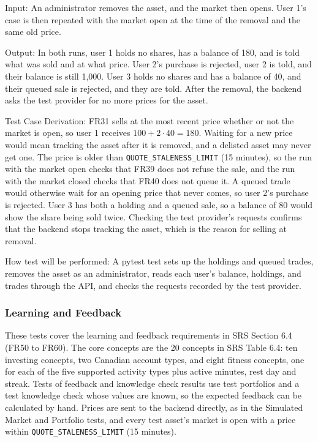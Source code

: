 \documentclass[12pt, titlepage]{article}
\begin{document}
\begin{enumerate}
Input: An administrator removes the asset, and the market then opens. User 1's
case is then repeated with the market open at the time of the removal and the
same old price.

Output: In both runs, user 1 holds no shares, has a balance of 180, and is told
what was sold and at what price. User 2's purchase is rejected, user 2 is told,
and their balance is still 1,000. User 3 holds no shares and has a balance of
40, and their queued sale is rejected, and they are told. After the removal,
the backend asks the test provider for no more prices for the asset.

Test Case Derivation: FR31 sells at the most recent price whether or not the
market is open, so user 1 receives $100 + 2 \cdot 40 = 180$. Waiting for a new
price would mean tracking the asset after it is removed, and a delisted asset
may never get one. The price is older than \texttt{QUOTE\_STALENESS\_LIMIT} (15
minutes), so the run with the market open checks that FR39 does not refuse the
sale, and the run with the market closed checks that FR40 does not queue it. A
queued trade would otherwise wait for an opening price that never comes, so
user 2's purchase is rejected. User 3 has both a holding and a queued sale, so
a balance of 80 would show the share being sold twice. Checking the test
provider's requests confirms that the backend stops tracking the asset, which
is the reason for selling at removal.

How test will be performed: A pytest test sets up the holdings and queued
trades, removes the asset as an administrator, reads each user's balance,
holdings, and trades through the API, and checks the requests recorded by the
test provider.

\end{enumerate}

\subsubsection{Learning and Feedback}

These tests cover the learning and feedback requirements in SRS Section 6.4
(FR50 to FR60). The core concepts are the 20 concepts in SRS Table 6.4: ten
investing concepts, two Canadian account types, and eight fitness concepts,
one for each of the five supported activity types plus active minutes, rest
day and streak. Tests of feedback and knowledge check results use test
portfolios and a test knowledge check whose values are known, so the expected
feedback can be calculated by hand. Prices are sent to the backend directly,
as in the Simulated Market and Portfolio tests, and every test asset's market
is open with a price within \texttt{QUOTE\_STALENESS\_LIMIT} (15 minutes).
\end{document}
